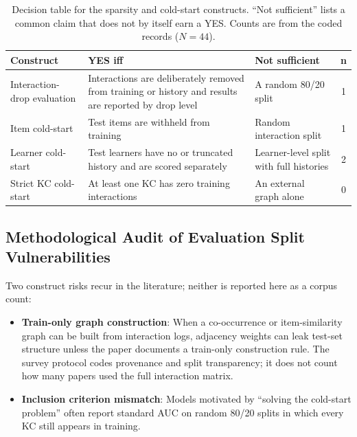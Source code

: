 \documentclass[lettersize,journal]{IEEEtran}
\begin{document}
\begin{table}[t]
\caption{Decision table for the sparsity and cold-start constructs. ``Not sufficient'' lists a common claim that does not by itself earn a YES. Counts are from the coded records ($N=44$).}
\label{tab:coldstart_decision}
\centering
\footnotesize
\setlength{\tabcolsep}{2.5pt}
\begin{tabular}{@{}>{\raggedright\arraybackslash}p{}>{\raggedright\arraybackslash}p{}>{\raggedright\arraybackslash}p{}c@{}}
\toprule
\textbf{Construct} & \textbf{YES iff} & \textbf{Not sufficient} & \textbf{n} \\
\midrule
Interaction-drop evaluation & Interactions are deliberately removed from training or history and results are reported by drop level & A random 80/20 split & 1 \\
Item cold-start & Test items are withheld from training & Random interaction split & 1 \\
Learner cold-start & Test learners have no or truncated history and are scored separately & Learner-level split with full histories & 2 \\
Strict KC cold-start & At least one KC has zero training interactions & An external graph alone & 0 \\
\bottomrule
\end{tabular}
\end{table}

\subsection{Methodological Audit of Evaluation Split Vulnerabilities}
Two construct risks recur in the literature; neither is reported here as a corpus count:
\begin{itemize}
    \item \textbf{Train-only graph construction}: When a co-occurrence or item-similarity graph can be built from interaction logs, adjacency weights can leak test-set structure unless the paper documents a train-only construction rule. The survey protocol codes provenance and split transparency; it does not count how many papers used the full interaction matrix.
    \item \textbf{Inclusion criterion mismatch}: Models motivated by ``solving the cold-start problem'' often report standard AUC on random 80/20 splits in which every KC still appears in training.
\end{itemize}
\end{document}
